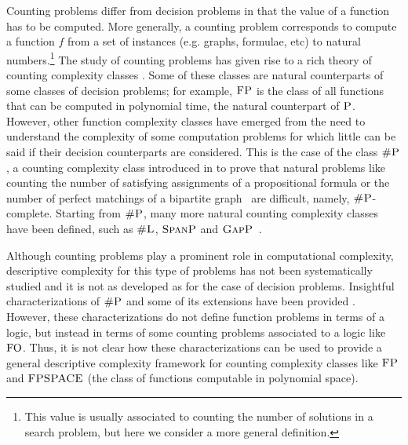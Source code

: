 Counting problems differ from decision problems in that the value of a function has to be computed.
More generally, a counting problem corresponds to compute a function $f$ from a set of instances (e.g. graphs, formulae, etc) to natural numbers.\footnote{This value is usually associated to counting the number of solutions
	in a search problem, but here we consider a more general definition.} 
The study of counting problems has given rise to a rich theory of counting complexity classes \cite{HV95,F97,arora2009computational}. Some of these classes are natural counterparts of some classes of decision problems; for example, $\text{\sc FP}$ 
is the class of all functions that can be computed in polynomial time, 
the natural counterpart of $\text{\sc P}$.
However, other function complexity classes have emerged from the need to understand the complexity of some computation problems for which little can be said if their decision counterparts are considered. This is the case of the class $\text{\sc \#P}$, a counting complexity class introduced in \cite{Valiant79} to prove that natural problems like counting the number of satisfying assignments of a propositional formula or the number of perfect matchings of a bipartite graph~\cite{Valiant79} are difficult, namely, $\text{\sc \#P}$-complete.
Starting from $\text{\sc \#P}$,
many more natural 
counting complexity classes have been defined, such as 
$\text{\sc \#L}$, $\text{\sc SpanP}$ and $\text{\sc GapP}$~\cite{HV95,F97}.

Although counting problems play a prominent role in computational complexity, descriptive complexity for this type of problems has not been systematically studied and it is not as developed as for the case of decision problems. Insightful characterizations of $\text{\sc \#P}$ and some of its extensions have been provided \cite{SalujaST95,ComptonG96}. However, these characterizations do not define function problems in terms of a logic, but instead in terms of some counting problems associated to a logic like ${\rm FO}$. Thus, it is not clear how these characterizations can be used to provide a general descriptive complexity framework for counting complexity classes like $\text{\sc FP}$ and $\text{\sc FPSPACE}$ (the class of functions computable in polynomial space). 

